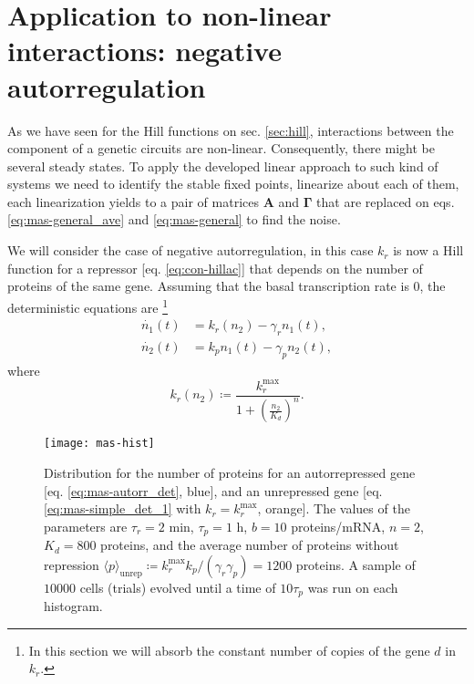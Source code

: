 \section{Application to non-linear interactions: negative autorregulation}
\label{sec:mas-neg_autorreg}

As we have seen for the Hill functions on sec. \ref{sec:hill}, interactions between the component of a genetic circuits are non-linear. Consequently, there might be several steady states. To apply the developed linear approach to such kind of systems we need to identify the stable fixed points, linearize about each of them, each linearization yields to a pair of matrices $\mathbf{A}$ and $\mathbf{\Gamma}$  that are replaced on eqs. \eqref{eq:mas-general_ave} and \eqref{eq:mas-general} to find the noise.

We will consider the case of negative autorregulation, in this case $k_r$ is now a Hill function for a repressor [eq. \eqref{eq:con-hillac}] that depends on the number of proteins of the same gene. Assuming that the basal transcription rate is $0$, the deterministic equations are \footnote{In this section we will absorb the constant number of copies of the gene $d$ in $k_r$.}
\begin{equation}
  \label{eq:mas-autorr_det}
  \begin{split}
    \dot{n_1}(t) &= k_r(n_2) - \gamma_rn_1(t),\\
    \dot{n_2}(t) &= k_pn_1(t)-\gamma_pn_2(t),
  \end{split}
\end{equation}
where
\begin{equation*}
  k_r(n_2) \coloneqq \frac{k_r^{\text{max}}}{1+\left(\frac{n_2}{K_d}\right)^n}.
\end{equation*}
\begin{figure}[H]
  \centering
  \texttt{[image: mas-hist]}
  \caption[Distribution of proteins for a gene with negative autorregulation]{\label{fig:mas-sim_hist}Distribution for the number of proteins for an autorrepressed gene [eq. \eqref{eq:mas-autorr_det}, blue], and an unrepressed gene [eq. \eqref{eq:mas-simple_det_1} with $k_r = k_r^\text{max}$, orange]. The  values of the parameters are $\tau_r=2$ min, $\tau_p=1$ h, $b=10$ proteins/mRNA, $n=2$, $K_d=800$ proteins, and the average number of proteins without repression $\langle p\rangle_\text{unrep} \coloneqq k_r^\text{max}k_p/(\gamma_r\gamma_p) = 1200$ proteins. A sample of $10000$ cells (trials) evolved until a time of $10\tau_p$ was run on each histogram.}
\end{figure}
